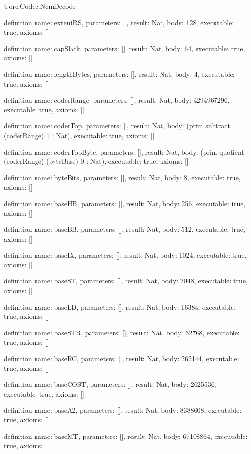 \begin{lexlean}{Uorc.Codec.NcmDecode}
\begin{semanticmodule}
definition{
  name: extentRS,
  parameters: [],
  result: Nat,
  body: 128,
  executable: true,
  axioms: []
}

definition{
  name: capSlack,
  parameters: [],
  result: Nat,
  body: 64,
  executable: true,
  axioms: []
}

definition{
  name: lengthBytes,
  parameters: [],
  result: Nat,
  body: 4,
  executable: true,
  axioms: []
}

definition{
  name: coderRange,
  parameters: [],
  result: Nat,
  body: 4294967296,
  executable: true,
  axioms: []
}

definition{
  name: coderTop,
  parameters: [],
  result: Nat,
  body: (prim subtract (coderRange) 1 : Nat),
  executable: true,
  axioms: []
}

definition{
  name: coderTopByte,
  parameters: [],
  result: Nat,
  body: (prim quotient (coderRange) (byteBase) 0 : Nat),
  executable: true,
  axioms: []
}

definition{
  name: byteBits,
  parameters: [],
  result: Nat,
  body: 8,
  executable: true,
  axioms: []
}

definition{
  name: baseHB,
  parameters: [],
  result: Nat,
  body: 256,
  executable: true,
  axioms: []
}

definition{
  name: baseBB,
  parameters: [],
  result: Nat,
  body: 512,
  executable: true,
  axioms: []
}

definition{
  name: baseIX,
  parameters: [],
  result: Nat,
  body: 1024,
  executable: true,
  axioms: []
}

definition{
  name: baseST,
  parameters: [],
  result: Nat,
  body: 2048,
  executable: true,
  axioms: []
}

definition{
  name: baseLD,
  parameters: [],
  result: Nat,
  body: 16384,
  executable: true,
  axioms: []
}

definition{
  name: baseSTR,
  parameters: [],
  result: Nat,
  body: 32768,
  executable: true,
  axioms: []
}

definition{
  name: baseRC,
  parameters: [],
  result: Nat,
  body: 262144,
  executable: true,
  axioms: []
}

definition{
  name: baseCOST,
  parameters: [],
  result: Nat,
  body: 2625536,
  executable: true,
  axioms: []
}

definition{
  name: baseA2,
  parameters: [],
  result: Nat,
  body: 8388608,
  executable: true,
  axioms: []
}

definition{
  name: baseMT,
  parameters: [],
  result: Nat,
  body: 67108864,
  executable: true,
  axioms: []
}


\end{semanticmodule}
\end{lexlean}
